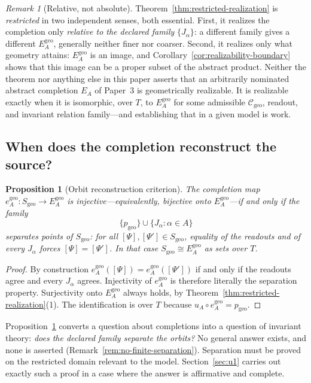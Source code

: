 \documentclass[11pt,a4paper]{article}
\theoremstyle{plain}
\newtheorem{proposition}[theorem]{Proposition}
\theoremstyle{definition}
\theoremstyle{remark}
\newtheorem{remark}[theorem]{Remark}
\newcommand{\Cgeo}{\mathcal{C}_{\mathrm{geo}}}
\newcommand{\Sgeo}{S_{\mathrm{geo}}}
\newcommand{\Egeo}{E_A^{\mathrm{geo}}}
\newcommand{\pgeo}{p_{\mathrm{geo}}}
\newcommand{\egeo}{e_A^{\mathrm{geo}}}
\begin{document}
\begin{remark}[Relative, not absolute]
\label{rem:relative}
Theorem~\ref{thm:restricted-realization} is \emph{restricted} in two independent senses, both
essential. First, it realizes the completion only \emph{relative to the declared family}
$\{J_\alpha\}$: a different family gives a different $\Egeo$, generally neither finer nor coarser.
Second, it realizes only what geometry attains: $\Egeo$ is an image, and
Corollary~\ref{cor:realizability-boundary} shows that this image can be a proper subset of the
abstract product. Neither the theorem nor anything else in this paper asserts that an arbitrarily
nominated abstract completion $E_A$ of Paper~3 is geometrically realizable. It is realizable exactly
when it is isomorphic, over $T$, to $\Egeo$ for some admissible $\Cgeo$, readout, and invariant
relation family---and establishing that in a given model is work.
\end{remark}

\subsection{When does the completion reconstruct the source?}

\begin{proposition}[Orbit reconstruction criterion]
\label{prop:orbit-reconstruction}
The completion map $\egeo\colon\Sgeo\to\Egeo$ is injective---equivalently, bijective onto
$\Egeo$---if and only if the family
\begin{equation}
\label{eq:sep-family}
\{\pgeo\}\cup\{J_\alpha : \alpha\in A\}
\end{equation}
\emph{separates points of $\Sgeo$}: for all $[\Psi],[\Psi']\in\Sgeo$, equality of the readouts and
of every $J_\alpha$ forces $[\Psi]=[\Psi']$. In that case $\Sgeo\cong\Egeo$ as sets over $T$.
\end{proposition}

\begin{proof}
By construction $\egeo([\Psi])=\egeo([\Psi'])$ if and only if the readouts agree and every
$J_\alpha$ agrees. Injectivity of $\egeo$ is therefore literally the separation property.
Surjectivity onto $\Egeo$ always holds, by Theorem~\ref{thm:restricted-realization}(1). The
identification is over $T$ because $u_A\circ\egeo=\pgeo$.
\end{proof}

Proposition~\ref{prop:orbit-reconstruction} converts a question about completions into a question of
invariant theory: \emph{does the declared family separate the orbits?} No general answer exists, and
none is asserted (Remark~\ref{rem:no-finite-separation}). Separation must be proved on the restricted
domain relevant to the model. Section~\ref{sec:u1} carries out exactly such a proof in a case where
the answer is affirmative and complete.
\end{document}
